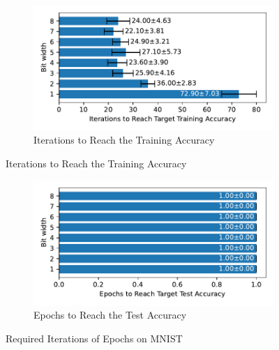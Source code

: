     \label{appendix:iterations_mnist}
        \begin{figure}[H]
            \centering
            \begin{subfigure}[H]{\textwidth}
                \centering
                \includegraphics[width=\textwidth]{../standard/MNIST/plots/mnist_train_iters_horizontal.pdf}
                \caption{Iterations to Reach the Training Accuracy}
            \end{subfigure}
        \end{figure}
        \begin{figure}[H]
            \centering
            \ContinuedFloat
            \begin{subfigure}[H]{\textwidth}
                \centering
                \includegraphics[width=\textwidth]{../standard/MNIST/plots/mnist_test_iters_horizontal.pdf}
                \caption{Epochs to Reach the Test Accuracy}
            \end{subfigure}
            \caption{Required Iterations of Epochs on MNIST}
        \end{figure}


